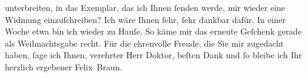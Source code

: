\begin{ledgroupsized}[t]{13cm}
               unterbreiten, in das Exemplar, das ich Ihnen ſenden werde, mir wieder eine Widmung
               einzuſchreiben? Ich wäre Ihnen ſehr, ſehr dankbar dafür. In einer Woche etwa bin ich
               wieder zu Hauſe. {\pb}So käme mir das erneute Geſchenk
               gerade als Weihnachtsgabe recht.\pend
           \pstart
           Für die ehrenvolle Freude, die Sie mir zugedacht haben, ſage ich Ihnen, verehrter
               Herr Doktor, beſten Dank und ſo bleibe ich Ihr herzlich ergebener\pend
           \pstart \spacefill\mbox{Felix Braun.}\pend{}
         
         \endnumbering{}\end{ledgroupsized}  \newcommand{\dateiname}{L02421}\newcommand{\titel}{Felix Braun an Arthur Schnitzler, 9. 12. 1924}\newcommand{\editorInnen}{Martin Anton Müller und Gerd-Hermann Susen}
      